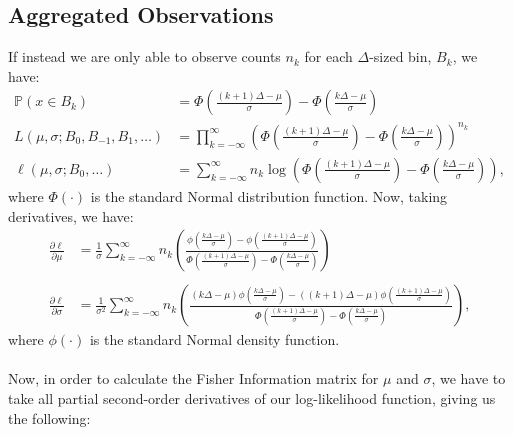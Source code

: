 \documentclass[11pt,a4,twosided,singlespacing,titlepagenumber=on,numbers=endperiod]{scrreprt}
\numberwithin{equation}{chapter} %
\theoremstyle{remark}
\begin{document}
\subsection{Aggregated Observations}
If instead we are only able to observe counts $n_k$ for each $\Delta$-sized bin, $B_k$, we have:
\begin{equation*}
	\begin{aligned}
		\mathbb{P}(x \in B_k) &= \Phi\left(\frac{(k+1) \Delta - \mu}{\sigma}\right) - \Phi\left(\frac{k \Delta - \mu}{\sigma}\right) \\
		L(\mu, \sigma; B_0, B_{-1}, B_1, \dots) &= \prod_{k=-\infty}^\infty \left( \Phi\left(\frac{(k + 1)\Delta - \mu}{\sigma}\right) - \Phi\left(\frac{k \Delta - \mu}{\sigma}\right) \right)^{n_k} \\
		\ell(\mu, \sigma; B_0, \dots) &= \sum_{k=-\infty}^\infty n_k \log \left(\Phi\left(\frac{(k + 1)\Delta - \mu}{\sigma}\right) - \Phi\left(\frac{k \Delta - \mu}{\sigma}\right)  \right),
	\end{aligned}
\end{equation*}
where $\Phi(\cdot)$ is the standard Normal distribution function. Now, taking derivatives, we have:
\begin{equation*}
	\begin{aligned}
		\frac{\partial \ell}{\partial \mu} &= \frac{1}{\sigma} \sum_{k=-\infty}^\infty n_k \left( 
		\frac{\phi \left( \frac{k \Delta - \mu}{\sigma} \right) - \phi \left( \frac{(k + 1) \Delta - \mu}{\sigma} \right) }
		     {\Phi \left( \frac{(k + 1) \Delta - \mu}{\sigma} \right) - \Phi \left(\frac{k \Delta - \mu}{\sigma} \right)}
		 \right) \\
		 \\
		 \frac{\partial \ell}{\partial \sigma} &= \frac{1}{\sigma^2} \sum_{k=-\infty}^\infty n_k \left( 
		\frac{(k \Delta - \mu) \phi \left( \frac{k \Delta - \mu}{\sigma} \right) - ((k + 1) \Delta - \mu)\phi \left( \frac{(k + 1) \Delta - \mu}{\sigma} \right) }
		     {\Phi \left( \frac{(k + 1) \Delta - \mu}{\sigma} \right) - \Phi \left(\frac{k \Delta - \mu}{\sigma} \right)}
		 \right),
	\end{aligned}
\end{equation*}
where $\phi(\cdot)$ is the standard Normal density function. \\\\
Now, in order to calculate the Fisher Information matrix for $\mu$ and $\sigma$, we have to take all partial second-order derivatives of our log-likelihood function, giving us the following:
\end{document}
